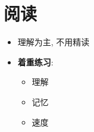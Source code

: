\chapter{阅读}

\begin{itemize}
  \item 理解为主, 不用精读
  \item \textbf{着重练习}:
  \begin{itemize}
    \item 理解
    \item 记忆
    \item 速度
  \end{itemize}
\end{itemize}